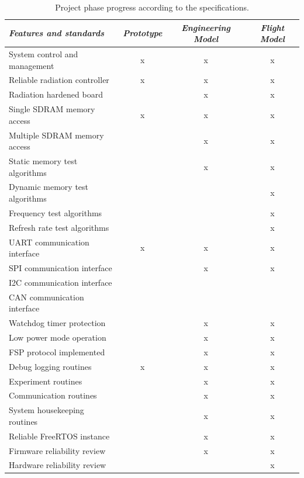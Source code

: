 \begin{table}[!h]
    \begin{center}
        \begin{tabular}{ l|ccc }
            \toprule
            \textit{Features and standards} & \textit{Prototype} & \textit{Engineering Model} & \textit{Flight Model} \\
            \midrule
            System control and management   & x & x & x \\
            Reliable radiation controller   & x & x & x \\
            Radiation hardened board        &   & x & x \\
            Single SDRAM memory access      & x & x & x \\
            Multiple SDRAM memory access    &   & x & x \\
            Static memory test algorithms   &   & x & x \\
            Dynamic memory test algorithms  &   &   & x \\
            Frequency test algorithms       &   &   & x \\
            Refresh rate test algorithms    &   &   & x \\
            UART communication interface    & x & x & x \\
            SPI communication interface     &   & x & x \\
            I2C communication interface     &   &   &   \\
            CAN communication interface     &   &   &   \\
            Watchdog timer protection       &   & x & x \\
            Low power mode operation        &   & x & x \\
            FSP protocol implemented        &   & x & x \\
            Debug logging routines          & x & x & x \\
            Experiment routines             &   & x & x \\
            Communication routines          &   & x & x \\
            System housekeeping routines    &   & x & x \\
            Reliable FreeRTOS instance      &   & x & x \\
            Firmware reliability review     &   & x & x \\
            Hardware reliability review     &   &   & x \\
            \bottomrule
        \end{tabular}
    \end{center}
    \caption{Project phase progress according to the specifications.}
    \label{tab:summary_phases}
\end{table}

